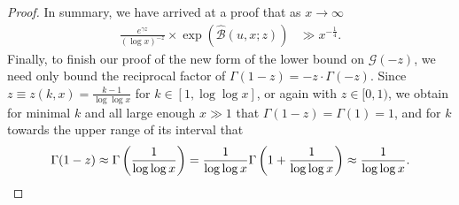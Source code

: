 \documentclass[11pt,reqno,a4letter]{article}
\numberwithin{figure}{section}
\numberwithin{table}{section}
\theoremstyle{plain}
\numberwithin{theorem}{section}
\theoremstyle{definition}
\begin{document}
\begin{proof}
In summary, we have arrived at a proof that 
as $x \rightarrow \infty$
\begin{align} 
\label{eqn_proof_tag_simpl_v1} 
\frac{e^{\gamma z}}{(\log x)^{-z}} \times \exp\left(\widehat{\mathcal{B}}(u, x; z)\right) & \gg 
     x^{-\frac{1}{4}}. 
\end{align} 
Finally, to finish our proof of the new form of the lower bound on $\mathcal{G}(-z)$, 
we need only bound the reciprocal factor of $\Gamma(1-z) = -z \cdot \Gamma(-z)$. 
Since $z \equiv z(k, x) = \frac{k-1}{\log\log x}$ for 
$k \in [1, \log\log x]$, or again with $z \in [0, 1)$, 
we obtain for minimal $k$ and all large enough $x \gg 1$ that 
$\Gamma(1-z) = \Gamma(1) = 1$, and for $k$ towards the upper range of 
its interval that 
\[
\Gamma(1-z) \approx \Gamma\left(\frac{1}{\log\log x}\right) = 
     \frac{1}{\log\log x} \Gamma\left(1 + \frac{1}{\log\log x}\right) 
     \approx \frac{1}{\log\log x}. 
     \qedhere 
\]
\end{proof} 
\end{document}
